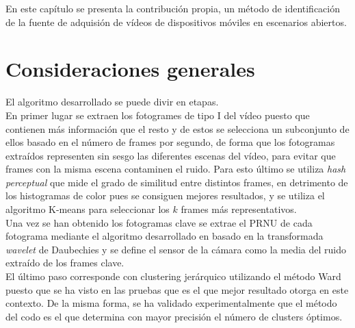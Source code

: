 En este capítulo se presenta la contribución propia, un método de identificación de la fuente de adquisión de vídeos de dispositivos móviles en escenarios abiertos.

\section{Consideraciones generales}
El algoritmo desarrollado se puede divir en etapas. \\

En primer lugar se extraen los fotogrames de tipo I del vídeo puesto que contienen más información que el resto y de estos se selecciona un subconjunto de ellos basado en el número de frames por segundo, de forma que los fotogramas extraídos representen sin sesgo las diferentes escenas del vídeo, para evitar que frames con la misma escena contaminen el ruido. Para esto último se utiliza \textit{hash perceptual} que mide el grado de similitud entre distintos frames, en detrimento de los histogramas de color pues se consiguen mejores resultados, y se utiliza el algoritmo K-means para seleccionar los $k$ frames más representativos. \\

Una vez se han obtenido los fotogramas clave se extrae el PRNU de cada fotograma mediante el algoritmo desarrollado en \cite{ana:2015} basado en la transformada \textit{wavelet} de Daubechies y se define el sensor de la cámara como la media del ruido extraído de los frames clave. \\

El último paso corresponde con clustering jerárquico utilizando el método Ward puesto que se ha visto en las pruebas que es el que mejor resultado otorga en este contexto. De la misma forma, se ha validado experimentalmente que el método del codo es el que determina con mayor precisión el número de clusters óptimos. \\

